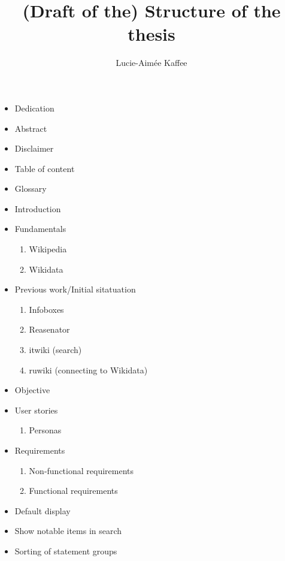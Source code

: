 \documentclass[11pt]{article}
\title {{(Draft of the) Structure of the thesis}}
\author {Lucie-Aim\'{e}e Kaffee}
\date{}
\begin{document}
  \maketitle
  \tableofcontents
  
  \begin{itemize}

  \item Dedication
  \item Abstract
  \item Disclaimer
  \item Table of content
  \item Glossary
  \item Introduction
  \item Fundamentals
  \begin{enumerate}
    \item Wikipedia
    \item Wikidata
  \end{enumerate}
  \item Previous work/Initial sitatuation
  \begin{enumerate}
    \item Infoboxes
    \item Reasenator
    \item itwiki (search)
    \item ruwiki (connecting to Wikidata)
  \end{enumerate}
  \item Objective
  \item User stories
  \begin{enumerate}
   \item Personas
  \end{enumerate}
  \item Requirements
  \begin{enumerate}
   \item Non-functional requirements
   \item Functional requirements
  \end{enumerate}
  \item Default display
  \item Show notable items in search
  \item Sorting of statement groups
  \end{itemize}
\end{document}
